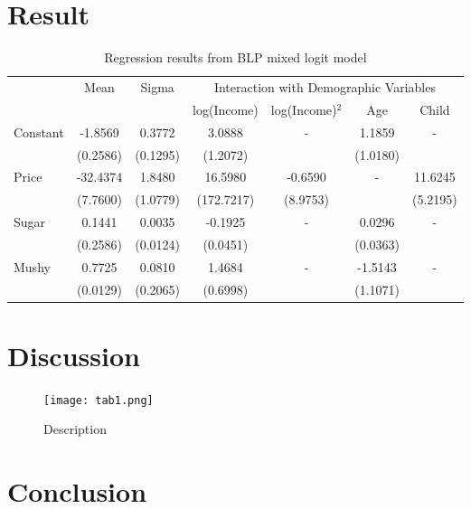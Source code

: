 \documentclass[11pt]{article}
\begin{document}
\section{Result} \label{sec:result}

\begin{table}[H]
  \centering
  \begin{tabular}{lcccccc}
      \hline
      & \multirow{2}{*}{Mean} & \multirow{2}{*}{Sigma} & \multicolumn{4}{c}{Interaction with Demographic Variables}\\
      \cline{4-7}
      & &  & log(Income) & log(Income)$^2$ & Age & Child \\
       \hline
       Constant & -1.8569 & 0.3772 & 3.0888 & - & 1.1859 & - \\
       & (0.2586) & (0.1295) & (1.2072) &  & (1.0180) &  \\ 
       Price & -32.4374 & 1.8480 & 16.5980 & -0.6590 & - & 11.6245 \\ 
       & (7.7600) & (1.0779) & (172.7217) & (8.9753) & & (5.2195) \\ 
       Sugar & 0.1441 & 0.0035 & -0.1925 & - & 0.0296 & -
       \\ 
       & (0.2586) & (0.0124) & (0.0451) & & (0.0363) & \\ 
       Mushy & 0.7725 & 0.0810 & 1.4684 & - & -1.5143 & - \\ 
       & (0.0129) & (0.2065) & (0.6998) & & (1.1071) & \\ 
        \hline
  \end{tabular}
  \caption{Regression results from BLP mixed logit model} 
  \label{blp-result}
\end{table}

\section{Discussion} \label{sec:discussion}

\begin{figure}[H]
  \centering
  \texttt{[image: tab1.png]}
  \caption{Description}
  \label{fig:1}
\end{figure}

\section{Conclusion} \label{sec:conclusion}

\newpage \printbibliography \label{sec:references}
\end{document}
